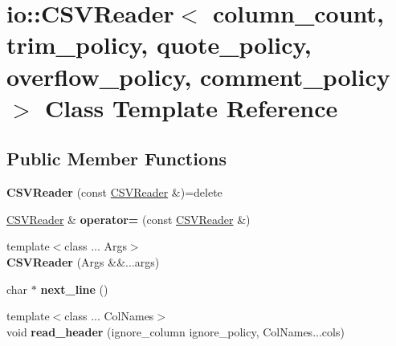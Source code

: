 \hypertarget{classio_1_1_c_s_v_reader}{}\section{io\+:\+:C\+S\+V\+Reader$<$ column\+\_\+count, trim\+\_\+policy, quote\+\_\+policy, overflow\+\_\+policy, comment\+\_\+policy $>$ Class Template Reference}
\label{classio_1_1_c_s_v_reader}
\subsection*{Public Member Functions}
\begin{DoxyCompactItemize}
\item 
\mbox{\label{classio_1_1_c_s_v_reader_a0507ac5abe201969a15df76795e13c28}} 
{\bfseries C\+S\+V\+Reader} (const \hyperlink{classio_1_1_c_s_v_reader}{C\+S\+V\+Reader} \&)=delete
\item 
\mbox{\label{classio_1_1_c_s_v_reader_a37046e6629cf4254037c14440f14141d}} 
\hyperlink{classio_1_1_c_s_v_reader}{C\+S\+V\+Reader} \& {\bfseries operator=} (const \hyperlink{classio_1_1_c_s_v_reader}{C\+S\+V\+Reader} \&)
\item 
\mbox{\label{classio_1_1_c_s_v_reader_a189debf95672e7cd7582e9f73d7203e5}} 
{\footnotesize template$<$class ... Args$>$ }\\{\bfseries C\+S\+V\+Reader} (Args \&\&...args)
\item 
\mbox{\label{classio_1_1_c_s_v_reader_a9fec7797cb27f64360cc48adc5f32c72}} 
char $\ast$ {\bfseries next\+\_\+line} ()
\item 
\mbox{\label{classio_1_1_c_s_v_reader_a9fad9ae02aa243dba6bc78156c5ce7e5}} 
{\footnotesize template$<$class ... Col\+Names$>$ }\\void {\bfseries read\+\_\+header} (ignore\+\_\+column ignore\+\_\+policy, Col\+Names...\+cols)
\item 
\mbox{\label{classio_1_1_c_s_v_reader_ab68eedff1bd59a49fa4ddb160dff94e0}} 

\end{DoxyCompactItemize}
